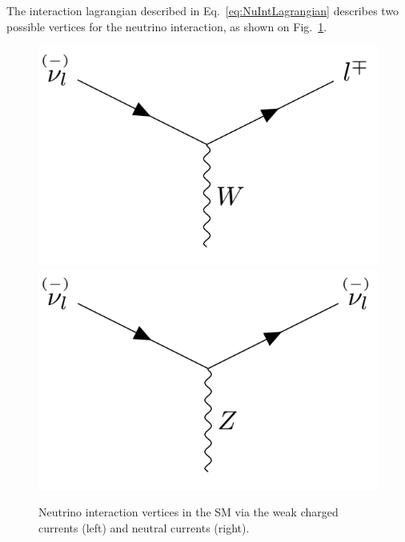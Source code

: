 The interaction lagrangian described in Eq.~\ref{eq:NuIntLagrangian} describes two possible vertices for the neutrino interaction, as shown on Fig.~\ref{fig:FeynmanNuIntVertices}.

\begin{figure}[hbtp]
\centering
\includegraphics[width=0.4\linewidth]{Plots/Theory/NeutrinoCCInteractionVertices.png}
\hspace{0.1\linewidth}
\includegraphics[width=0.4\linewidth]{Plots/Theory/NeutrinoNCInteractionVertices.png}
\caption[Neutrino interaction vertices in the SM]{Neutrino interaction vertices in the \acrshort{SM} via the weak charged currents (left) and neutral currents (right).}
\label{fig:FeynmanNuIntVertices}
\end{figure}





